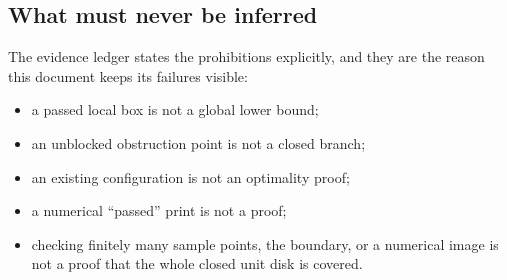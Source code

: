 \subsection{What must never be inferred}

The evidence ledger states the prohibitions explicitly, and they are the reason this document
keeps its failures visible:
\begin{itemize}[leftmargin=1.4em,itemsep=2pt]
\item a passed local box is not a global lower bound;
\item an unblocked obstruction point is not a closed branch;
\item an existing configuration is not an optimality proof;
\item a numerical ``passed'' print is not a proof;
\item checking finitely many sample points, the boundary, or a numerical image is not a proof that
the whole closed unit disk is covered.
\end{itemize}
